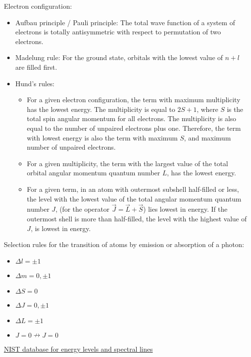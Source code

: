 			\noindent
			Electron configuration:
			\begin{itemize}
				\item Aufbau principle / Pauli principle: The total wave function of a system of electrons is totally antisymmetric with respect to permutation of two electrons.
				\item Madelung rule: For the ground state, orbitals with the lowest value of $n+l$ are filled first.
				\item Hund's rules:
					\begin{itemize}
						\item For a given electron configuration, the term with maximum multiplicity has the lowest energy. The multiplicity is equal to $2S+1$, where $S$ is the total spin angular momentum for all electrons. The multiplicity is also equal to the number of unpaired electrons plus one. Therefore, the term with lowest energy is also the term with maximum $S$, and maximum number of unpaired electrons.
						\item For a given multiplicity, the term with the largest value of the total orbital angular momentum quantum number  $L$, has the lowest energy.
						\item For a given term, in an atom with outermost subshell half-filled or less, the level with the lowest value of the total angular momentum quantum number  $J$, (for the operator $\vec{J} = \vec{L} + \vec{S}$) lies lowest in energy. If the outermost shell is more than half-filled, the level with the highest value of  $J$, is lowest in energy.
					\end{itemize}
			\end{itemize}

			\noindent
			Selection rules for the transition of atoms by emission or absorption of a photon:
			\begin{itemize}
				\item $\Delta l = \pm 1$
				\item $\Delta m = 0, \pm 1$
				\item $\Delta S = 0$
				\item $\Delta J = 0, \pm 1$
				\item $\Delta L = \pm 1$
				\item $J=0 \nrightarrow J=0$
			\end{itemize}

			\noindent
			\href{https://www.nist.gov/pml/atomic-spectra-database}{NIST database for energy levels and spectral lines}

